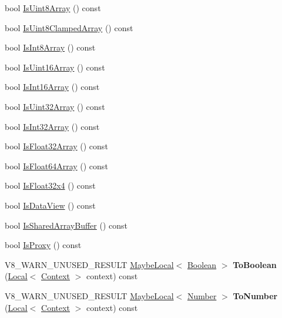 \begin{DoxyCompactItemize}
bool \hyperlink{classv8_1_1Value_acbe2cd9c9cce96ee498677ba37c8466d}{Is\+Uint8\+Array} () const 
\item 
bool \hyperlink{classv8_1_1Value_ad3cb464ab5ef0215bd2cbdd4eb2b7e3d}{Is\+Uint8\+Clamped\+Array} () const 
\item 
bool \hyperlink{classv8_1_1Value_a10a88a2794271dfcd9c3abd565e8f28a}{Is\+Int8\+Array} () const 
\item 
bool \hyperlink{classv8_1_1Value_a4a45fabf58b241f5de3086a3dd0a09ae}{Is\+Uint16\+Array} () const 
\item 
bool \hyperlink{classv8_1_1Value_a928c586639dd75ae4efdaa66b1fc4d50}{Is\+Int16\+Array} () const 
\item 
bool \hyperlink{classv8_1_1Value_a5e39229dc74d534835cf4ceba10676f4}{Is\+Uint32\+Array} () const 
\item 
bool \hyperlink{classv8_1_1Value_a48eac78a49c8b42d9f8cf05c514b3750}{Is\+Int32\+Array} () const 
\item 
bool \hyperlink{classv8_1_1Value_a4effc7ca1a221dd8c1e23c0f28145ef0}{Is\+Float32\+Array} () const 
\item 
bool \hyperlink{classv8_1_1Value_a293f140b81b0219d1497e937ed948b1e}{Is\+Float64\+Array} () const 
\item 
bool \hyperlink{classv8_1_1Value_ab071bf567d89c8ce1489b1b7d93abc36}{Is\+Float32x4} () const 
\item 
bool \hyperlink{classv8_1_1Value_afd20ab51e79658acc405c12dad2260ab}{Is\+Data\+View} () const 
\item 
bool \hyperlink{classv8_1_1Value_aa4ce26f174a4c1823dec56eb946d3134}{Is\+Shared\+Array\+Buffer} () const 
\item 
bool \hyperlink{classv8_1_1Value_a8a056f765e6e07a1d957fdc1be9b00d5}{Is\+Proxy} () const 
\item 
V8\+\_\+\+W\+A\+R\+N\+\_\+\+U\+N\+U\+S\+E\+D\+\_\+\+R\+E\+S\+U\+LT \hyperlink{classv8_1_1MaybeLocal}{Maybe\+Local}$<$ \hyperlink{classv8_1_1Boolean}{Boolean} $>$ {\bfseries To\+Boolean} (\hyperlink{classv8_1_1Local}{Local}$<$ \hyperlink{classv8_1_1Context}{Context} $>$ context) const \hypertarget{classv8_1_1Value_a40a62da1dd52184cc4c1fd735c538f8b}{}\label{classv8_1_1Value_a40a62da1dd52184cc4c1fd735c538f8b}

\item 
V8\+\_\+\+W\+A\+R\+N\+\_\+\+U\+N\+U\+S\+E\+D\+\_\+\+R\+E\+S\+U\+LT \hyperlink{classv8_1_1MaybeLocal}{Maybe\+Local}$<$ \hyperlink{classv8_1_1Number}{Number} $>$ {\bfseries To\+Number} (\hyperlink{classv8_1_1Local}{Local}$<$ \hyperlink{classv8_1_1Context}{Context} $>$ context) const \hypertarget{classv8_1_1Value_a9fa8386aa436c2b83c9af6a65b8a2cad}{}\label{classv8_1_1Value_a9fa8386aa436c2b83c9af6a65b8a2cad}


\end{DoxyCompactItemize}
